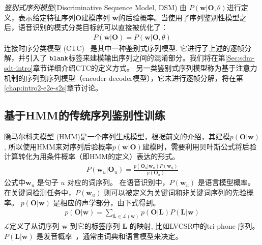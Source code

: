{\em 鉴别式序列模型}(Discriminative Sequence Model, DSM) 由 $P(\mathbf{w}|\mathbf{O}, \theta)$进行定义，表示给定特征序列$\mathbf{O}$建模序列 $\mathbf{w}$的后验概率。当使用了序列鉴别性模型之后，语音识别的模式分类目标就可以直接被优化了：
\begin{equation}
\begin{split}
P(\mathbf{w}|\mathbf{O})=P(\mathbf{w}|\mathbf{O}, \theta)
\end{split}
\end{equation}
连接时序分类模型 (CTC)~\cite{graves2006connectionist} 是其中一种鉴别式序列模型. 它进行了上述的逐帧分解，并引入了 $\tt blank$标签来建模输出序列之间的混淆部分。我们将在第\ref{Sec:sdm-sdt-intro}章节详细介绍CTC的定义方式。
另一类鉴别式序列模型称为基于注意力机制的序列到序列模型（encoder-decoder模型），它未进行逐帧分解，将在第\ref{chap:intro2-e2e-s2s}章节讨论。


%

\subsection{基于HMM的传统序列鉴别性训练}
\label{Sec:sgm-sdt-intro}

隐马尔科夫模型 (HMM)是一个序列生成模型，根据前文的介绍，其建模$p(\mathbf{O}|\mathbf{w})$, 所以使用HMM来对序列后验概率$p(\mathbf{w}|\mathbf{O})$建模时，需要利用贝叶斯公式将后验计算转化为用条件概率（即HMM的定义）表达的形式。
\begin{equation}
\label{equ:map-dec}
\begin{split}
P(\mathbf{w}_u|\mathbf{O}_u)=\frac {p(\mathbf{O}_u|\mathbf{w}_u)P(\mathbf{w}_u)}{p(\mathbf{O}_u)}  
\end{split}
\end{equation}
公式中$\mathbf{w}_u$ 是句子 $u$ 对应的词序列。 在语音识别中，$P(\mathbf{w}_u)$ 是语言模型概率。在关键词检测任务中，$P(\mathbf{w}_u)$ 则可以被定义为关键词和非关键词序列的先验概率。
$p(\mathbf{O}|\mathbf{w})$ 是相应的声学部分，由下式得到。
\begin{equation}
\label{equ:lexicon}
\begin{split}
p(\mathbf{O}|\mathbf{w})=\sum_{\mathbf{L}\in\mathcal{L}(\mathbf{w})} p(\mathbf{O}|\mathbf{L})P(\mathbf{L}|\mathbf{w})
\end{split}
\end{equation}
$\mathcal{L}$定义了从词序列 $\mathbf{w}$ 到它的标签序列 $\mathbf{L}$ 的映射, 比如LVCSR中的tri-phone 序列。 $P(\mathbf{L}|\mathbf{w})$ 是发音概率~\cite{chen2015pronunciation}，通常由词典和语言模型来决定。

